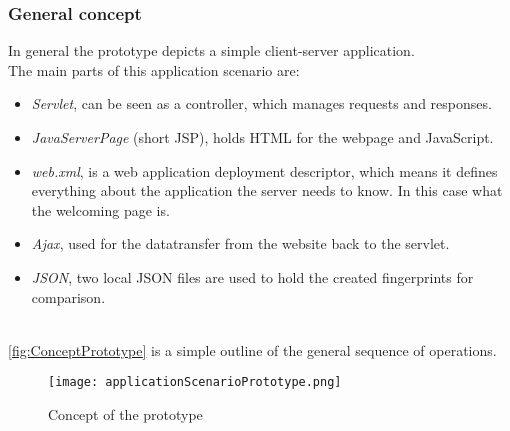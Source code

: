 \subsubsection{General concept}
In general the prototype depicts a simple client-server application. \\
The main parts of this application scenario are:\\
\begin{itemize}
	\item \textit{Servlet}, can be seen as a controller, which manages requests and responses.
	\item \textit{JavaServerPage }(short JSP), holds HTML for the webpage and JavaScript.
	\item \textit{web.xml}, is a web application deployment descriptor, which means it defines everything about the application the server needs to know. In this case what the welcoming page is.
	\item \textit{Ajax}, used for the datatransfer from the website back to the servlet.
	\item \textit{JSON}, two local JSON files are used to hold the created fingerprints for comparison.\\\\
\end{itemize} 

\autoref{fig:ConceptPrototype} is a simple outline of the general sequence of operations.

\begin{figure}[H]
	\centering
	\texttt{[image: applicationScenarioPrototype.png]}
	\caption{Concept of the prototype\\}
	\label{fig:ConceptPrototype}
\end{figure}

